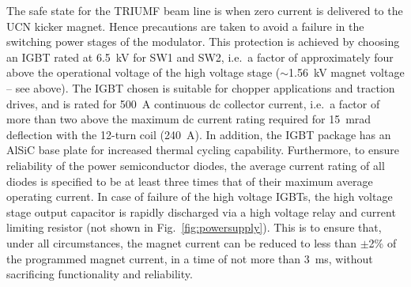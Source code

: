 \documentclass[aps,prab,twocolumn,superscriptaddress]{revtex4-1}
\begin{document}
The safe state for the TRIUMF beam line is when zero current is delivered to the UCN kicker magnet. Hence precautions are taken to avoid a failure in the switching power stages of the modulator.  This protection is achieved by choosing an IGBT rated at 6.5~kV for SW1 and SW2, i.e.~a factor of approximately four above the operational voltage  of the high voltage stage ($\sim$1.56~kV magnet voltage -- see  above). The IGBT chosen is suitable for chopper applications and traction drives, and is rated for 500~A continuous dc collector current, i.e.~a factor of more than two above the maximum dc current rating required for 15~mrad deflection with the 12-turn coil (240~A). In addition, the IGBT package has an AlSiC base plate for increased thermal cycling capability. Furthermore, to ensure reliability of the power semiconductor diodes, the average current rating of all diodes is specified to be at least three times that of their maximum average operating current. In case of failure of the high voltage IGBTs, the high voltage stage output capacitor is rapidly discharged via a high voltage relay and current limiting resistor (not shown in Fig.~\ref{fig:powersupply}). This is to ensure that, under all circumstances, the magnet current can be reduced to less than $\pm$2\% of the programmed magnet current, in a time of not more than 3~ms, without sacrificing functionality and reliability.
\end{document}
